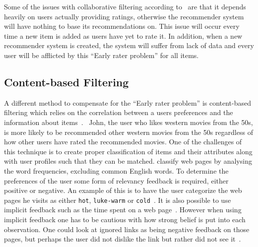 Some of the issues with collaborative filtering according to~\cite{claypool1999combining} are that it depends heavily on users actually providing ratings, otherwise the recommender system will have nothing to base its recommendations on. This issue will occur every time a new item is added as users have yet to rate it.
In addition, when a new recommender system is created, the system will suffer from lack of data and every user will be afflicted by this ``Early rater problem'' for all items.


\subsection{Content-based Filtering}
\label{sec:analysis:recommender-methods:content-based-filtering}

A different method to compensate for the ``Early rater problem'' is content-based filtering which relies on the correlation between a users preferences and the information about items~\cite{claypool1999combining}.
\eg~John, the user who likes western movies from the 50s, is more likely to be recommended other western movies from the 50s regardless of how other users have rated the recommended movies.
One of the challenges of this technique is to create proper classification of items and their attributes along with user profiles such that they can be matched.
\cite{pazzani1996syskill} classify web pages by analysing the word frequencies, excluding common English words.
To determine the preferences of the user some form of relevancy feedback is required, either positive or negative. An example of this is to have the user categorize the web pages he visits as either \texttt{hot}, \texttt{luke-warm} or \texttt{cold}~\cite{pazzani1996syskill}.
It is also possible to use implicit feedback such as the time spent on a web page~\cite{van2000using}.
However when using implicit feedback one has to be cautious with how strong belief is put into each observation. One could look at ignored links as being negative feedback on those pages, but perhaps the user did not dislike the link but rather did not see it~\cite{van2000using}.


